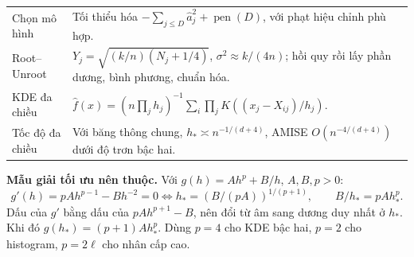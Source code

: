\documentclass[11pt,a4paper]{article}
\begin{document}
\begin{longtable}{p{}p{}}
Chọn mô hình & Tối thiểu hóa $-\sum_{j\leq D}\widehat a_j^2+\operatorname{pen}(D)$, với phạt hiệu chỉnh phù hợp.\\
Root--Unroot & $Y_j=\sqrt{(k/n)(N_j+1/4)}$, $\sigma^2\approx k/(4n)$; hồi quy rồi lấy phần dương, bình phương, chuẩn hóa.\\
KDE đa chiều & $\widehat f(x)=(n\prod_jh_j)^{-1}\sum_i\prod_jK((x_j-X_{ij})/h_j)$.\\
Tốc độ đa chiều & Với băng thông chung, $h_*\asymp n^{-1/(d+4)}$, AMISE $O(n^{-4/(d+4)})$ dưới độ trơn bậc hai.\\
\bottomrule
\end{longtable}

\textbf{Mẫu giải tối ưu nên thuộc.} Với $g(h)=Ah^p+B/h$, $A,B,p>0$:
\[
g'(h)=pAh^{p-1}-Bh^{-2}=0\iff h_*=(B/(pA))^{1/(p+1)},
\qquad B/h_*=pAh_*^p.
\]
Dấu của $g'$ bằng dấu của $pAh^{p+1}-B$, nên đổi từ âm sang dương duy nhất ở $h_*$. Khi đó $g(h_*)=(p+1)Ah_*^p$. Dùng $p=4$ cho KDE bậc hai, $p=2$ cho histogram, $p=2\ell$ cho nhân cấp cao.


\end{document}
